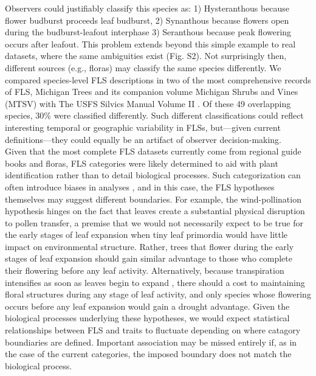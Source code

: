 \documentclass{article}
\begin{document}
{\noindent Observers could justifiably classify this species as: 1) Hysteranthous because flower budburst proceeds leaf budburst, 2) Synanthous because flowers open during the budburst-leafout interphase 3) Seranthous because peak flowering occurs after leafout. This problem extends beyond this simple example to real datasets, \citep[e.g.][]{OKeefe2015} where the same ambiguities exist (Fig. S2). Not surprisingly then, different sources (e.g., floras) may classify the same species differently. We compared species-level FLS descriptions in two of the most comprehensive records of FLS, Michigan Trees and its companion volume Michigan Shrubs and Vines (MTSV) \citep{Barnes2004,Barnes2016} with The USFS Silvics Manual Volume II \citep{Burns1990}. Of these 49 overlapping species, 30\% were classified differently. Such different classifications could reflect interesting temporal or geographic variability in FLSs, but---given current definitions---they could equally be an artifact of observer decision-making.\\

\noindent Given that the most complete FLS datasets currently come from regional guide books and floras, FLS categories were likely determined to aid with plant identification rather than to detail biological processes. Such categorization can often introduce biases in analyses \citep{}, and in this case, the FLS hypotheses themselves may suggest different boundaries. For example, the wind-pollination hypothesis hinges on the fact that leaves create a substantial physical disruption to pollen transfer, a premise that we would not necessarily expect to be true for the early stages of leaf expansion when tiny leaf primordia would have little impact on environmental structure. Rather, trees that flower during the early stages of leaf expansion should gain similar advantage to those who complete their flowering before any leaf activity. Alternatively, because transpiration intensifies as soon as leaves begin to expand \citep{Breda1996,Wang2018}, there should a cost to maintaining floral structures during any stage of leaf activity, and only species whose flowering occurs before any leaf expansion would gain a drought advantage. Given the biological processes underlying these hypotheses, we would expect statistical relationships between FLS and traits to fluctuate depending on where catagory boundiaries are defined. Important association may be missed entirely if, as in the case of the current categories, the imposed boundary does not match the biological process.

}
\end{document}
